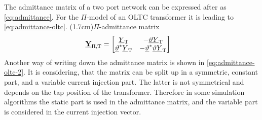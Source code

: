 The admittance matrix of a two port network can be expressed after \textcite{machowskiPowerSystemDynamics2020} as \autoref{eq:admittance}. For the $\Pi$-model of an \acs{OLTC} transformer it is leading to \autoref{eq:admittance-oltc}.
\sidenote(1.7cm){$\Pi$-admittance matrix}
\begin{align}
    \underline{\mathrm{\textbf{Y}}}_\mathrm{\Pi,T}&= 
    \begin{bmatrix}
        \underline{Y}_\mathrm{T} & -\underline{\vartheta}\underline{Y}_\mathrm{T} \\
        \underline{\vartheta}^*\underline{Y}_\mathrm{T} & -\underline{\vartheta}^*\underline{\vartheta}\underline{Y}_\mathrm{T}
    \end{bmatrix} \label{eq:admittance-oltc}
\end{align}
Another way of writing down the admittance matrix is shown in \autoref{eq:admittance-oltc-2}. It is considering, that the matrix can be split up in a symmetric, constant part, and a variable current injection part. The latter is not symmetrical and depends on the tap position of the transformer. Therefore in some simulation algorithms the static part is used in the admittance matrix, and the variable part is considered in the current injection vector. \autocite{machowskiPowerSystemDynamics2020}

